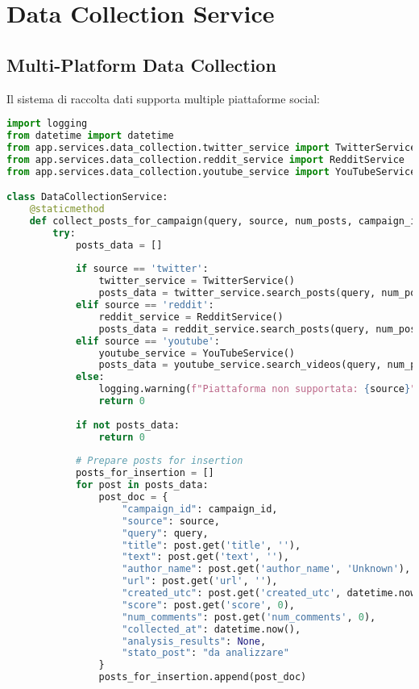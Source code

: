 \documentclass[12pt,a4paper]{report}
\begin{document}
\section{Data Collection Service}

\subsection{Multi-Platform Data Collection}

Il sistema di raccolta dati supporta multiple piattaforme social:

\begin{lstlisting}[language=Python, caption=Data Collection Service]
import logging
from datetime import datetime
from app.services.data_collection.twitter_service import TwitterService
from app.services.data_collection.reddit_service import RedditService
from app.services.data_collection.youtube_service import YouTubeService

class DataCollectionService:
    @staticmethod
    def collect_posts_for_campaign(query, source, num_posts, campaign_id, mongo_manager):
        try:
            posts_data = []
            
            if source == 'twitter':
                twitter_service = TwitterService()
                posts_data = twitter_service.search_posts(query, num_posts)
            elif source == 'reddit':
                reddit_service = RedditService()
                posts_data = reddit_service.search_posts(query, num_posts)
            elif source == 'youtube':
                youtube_service = YouTubeService()
                posts_data = youtube_service.search_videos(query, num_posts)
            else:
                logging.warning(f"Piattaforma non supportata: {source}")
                return 0
            
            if not posts_data:
                return 0
            
            # Prepare posts for insertion
            posts_for_insertion = []
            for post in posts_data:
                post_doc = {
                    "campaign_id": campaign_id,
                    "source": source,
                    "query": query,
                    "title": post.get('title', ''),
                    "text": post.get('text', ''),
                    "author_name": post.get('author_name', 'Unknown'),
                    "url": post.get('url', ''),
                    "created_utc": post.get('created_utc', datetime.now()),
                    "score": post.get('score', 0),
                    "num_comments": post.get('num_comments', 0),
                    "collected_at": datetime.now(),
                    "analysis_results": None,
                    "stato_post": "da analizzare"
                }
                posts_for_insertion.append(post_doc)
            

\end{lstlisting}
\end{document}
